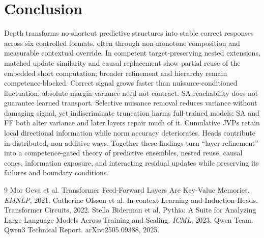 \documentclass[10pt]{article}
\begin{document}
\section{Conclusion}
Depth transforms no-shortcut predictive structures into stable correct responses across six controlled formats, often through non-monotone composition and measurable contextual override. In competent target-preserving nested extensions, matched update similarity and causal replacement show partial reuse of the embedded short computation; broader refinement and hierarchy remain competence-blocked. Correct signal grows faster than nuisance-conditioned fluctuation; absolute margin variance need not contract. SA reachability does not guarantee learned transport. Selective nuisance removal reduces variance without damaging signal, yet indiscriminate truncation harms full-trained models; SA and FF both alter variance and later layers repair much of it. Cumulative JVPs retain local directional information while norm accuracy deteriorates. Heads contribute in distributed, non-additive ways. Together these findings turn ``layer refinement'' into a competence-gated theory of predictive ensembles, nested reuse, causal cones, information exposure, and interacting residual updates while preserving its failures and boundary conditions.

\begin{thebibliography}{9}
 Mor Geva et al. Transformer Feed-Forward Layers Are Key-Value Memories. \emph{EMNLP}, 2021.
 Catherine Olsson et al. In-context Learning and Induction Heads. Transformer Circuits, 2022.
 Stella Biderman et al. Pythia: A Suite for Analyzing Large Language Models Across Training and Scaling. \emph{ICML}, 2023.
 Qwen Team. Qwen3 Technical Report. arXiv:2505.09388, 2025.
\end{thebibliography}
\end{document}
